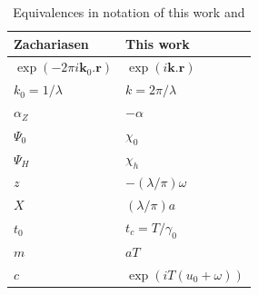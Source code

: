 \documentclass[preprint]{iucr}              %
\begin{document}
\begin{table}
\caption{Equivalences in notation of this work and \cite{ZachariasenBook}}
    \begin{center}
\begin{tabular}{ll}      %
 Zachariasen    & This work     \\
\hline
$\exp(-2\pi i \textbf{k}_0.\textbf{r})$ & $\exp(i\textbf{k}.\textbf{r})$      \\
 $k_0=1/\lambda$ & $k=2 \pi / \lambda$      \\
 $\alpha_Z$      & $-\alpha$                \\
 $\Psi_0$      & $\chi_0$                 \\
 $\Psi_H$      & $\chi_h$                 \\
 $z$           & $-(\lambda/\pi) \omega$  \\
 $X$           & $(\lambda/\pi) a$        \\
 $t_0$         & $t_c=T/\gamma_0$         \\
 $m$           & $a T$                    \\
 $c$  & $\exp(i T (u_0+\omega))$   
 \end{tabular}
     \end{center}
\end{table}












\end{document}
